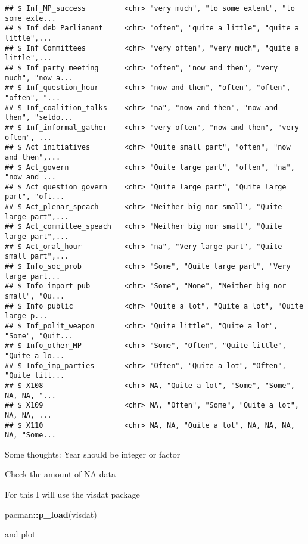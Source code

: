 \documentclass[
]{article}
\newenvironment{Shaded}{\begin{snugshade}}{\end{snugshade}}
\newcommand{\KeywordTok}[1]{\textcolor[rgb]{0.13,0.29,0.53}{\textbf{#1}}}
\newcommand{\NormalTok}[1]{#1}
\newcommand{\OperatorTok}[1]{\textcolor[rgb]{0.81,0.36,0.00}{\textbf{#1}}}
\newcommand{\StringTok}[1]{\textcolor[rgb]{0.31,0.60,0.02}{#1}}
\begin{document}
\begin{verbatim}
## $ Inf_MP_success         <chr> "very much", "to some extent", "to some exte...
## $ Inf_deb_Parliament     <chr> "often", "quite a little", "quite a little",...
## $ Inf_Committees         <chr> "very often", "very much", "quite a little",...
## $ Inf_party_meeting      <chr> "often", "now and then", "very much", "now a...
## $ Inf_question_hour      <chr> "now and then", "often", "often", "often", "...
## $ Inf_coalition_talks    <chr> "na", "now and then", "now and then", "seldo...
## $ Inf_informal_gather    <chr> "very often", "now and then", "very often", ...
## $ Act_initiatives        <chr> "Quite small part", "often", "now and then",...
## $ Act_govern             <chr> "Quite large part", "often", "na", "now and ...
## $ Act_question_govern    <chr> "Quite large part", "Quite large part", "oft...
## $ Act_plenar_speach      <chr> "Neither big nor small", "Quite large part",...
## $ Act_committee_speach   <chr> "Neither big nor small", "Quite large part",...
## $ Act_oral_hour          <chr> "na", "Very large part", "Quite small part",...
## $ Info_soc_prob          <chr> "Some", "Quite large part", "Very large part...
## $ Info_import_pub        <chr> "Some", "None", "Neither big nor small", "Qu...
## $ Info_public            <chr> "Quite a lot", "Quite a lot", "Quite large p...
## $ Inf_polit_weapon       <chr> "Quite little", "Quite a lot", "Some", "Quit...
## $ Info_other_MP          <chr> "Some", "Often", "Quite little", "Quite a lo...
## $ Info_imp_parties       <chr> "Often", "Quite a lot", "Often", "Quite litt...
## $ X108                   <chr> NA, "Quite a lot", "Some", "Some", NA, NA, "...
## $ X109                   <chr> NA, "Often", "Some", "Quite a lot", NA, NA, ...
## $ X110                   <chr> NA, NA, "Quite a lot", NA, NA, NA, NA, "Some...
\end{verbatim}

Some thoughts: Year should be integer or factor

Check the amount of NA data

For this I will use the visdat package

\begin{Shaded}
\begin{Highlighting}[]
\NormalTok{pacman}\OperatorTok{::}\KeywordTok{p_load}\NormalTok{(visdat)}
\end{Highlighting}
\end{Shaded}

and plot

\begin{Shaded}
\end{Shaded}
\end{document}
